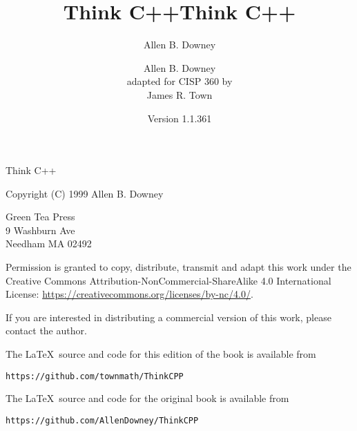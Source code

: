 \documentclass{book}
\title{Think C++}
\author{Allen B. Downey}
\date{}
\begin{document}
\title {Think C++}
\author {Allen B. Downey \\ adapted for CISP 360 by \\ James R. Town}
\date {Version 1.1.361}
\maketitle

\vspace{2in}
\begin{center}
{\Large Think C++}

\vspace{0.25in}

Copyright (C) 1999  Allen B. Downey
\end{center}
\vspace{0.25in}

\begin{flushleft}
Green Tea Press       \\
9 Washburn Ave \\
Needham MA 02492
\end{flushleft}

Permission is granted to copy, distribute, transmit and adapt this
work under the Creative Commons Attribution-NonCommercial-ShareAlike 4.0
International License: \url{https://creativecommons.org/licenses/by-nc/4.0/}.

If you are interested in distributing a commercial version of this
work, please contact the author.

The \LaTeX\ source and code for this edition of the book is available from

\begin{verbatim}
https://github.com/townmath/ThinkCPP
\end{verbatim}

The \LaTeX\ source and code for the original book is available from

\begin{verbatim}
https://github.com/AllenDowney/ThinkCPP
\end{verbatim}

\frontmatter
\tableofcontents

\mainmatter
















\printindex
\end{document}
